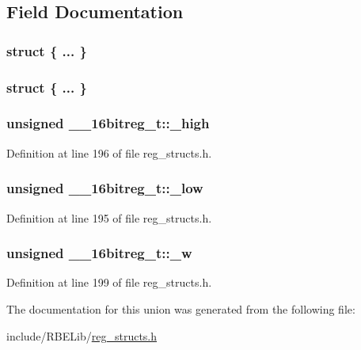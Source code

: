 \subsection{Field Documentation}
\hypertarget{union____16bitreg__t_ab909e9b2412865a9e97536d692f260b9}{\subsubsection[{"@43}]{\setlength{\rightskip}{0pt plus 5cm}struct \{ ... \} }}\label{union____16bitreg__t_ab909e9b2412865a9e97536d692f260b9}
\hypertarget{union____16bitreg__t_a9fd4cd99474251f90c63248760bd2a0a}{\subsubsection[{"@45}]{\setlength{\rightskip}{0pt plus 5cm}struct \{ ... \} }}\label{union____16bitreg__t_a9fd4cd99474251f90c63248760bd2a0a}
\hypertarget{union____16bitreg__t_a6a6132a8e0bb2790f3d7efcd7ee5b970}{
\subsubsection[{\+\_\+high}]{\setlength{\rightskip}{0pt plus 5cm}unsigned \+\_\+\+\_\+16bitreg\+\_\+t\+::\+\_\+high}}\label{union____16bitreg__t_a6a6132a8e0bb2790f3d7efcd7ee5b970}


Definition at line 196 of file reg\+\_\+structs.\+h.

\hypertarget{union____16bitreg__t_a9be891e55b5143ae68b469bb8a6078cb}{
\subsubsection[{\+\_\+low}]{\setlength{\rightskip}{0pt plus 5cm}unsigned \+\_\+\+\_\+16bitreg\+\_\+t\+::\+\_\+low}}\label{union____16bitreg__t_a9be891e55b5143ae68b469bb8a6078cb}


Definition at line 195 of file reg\+\_\+structs.\+h.

\hypertarget{union____16bitreg__t_a9dbb4f0c94a03ccdb3ea488d6de97e23}{
\subsubsection[{\+\_\+w}]{\setlength{\rightskip}{0pt plus 5cm}unsigned \+\_\+\+\_\+16bitreg\+\_\+t\+::\+\_\+w}}\label{union____16bitreg__t_a9dbb4f0c94a03ccdb3ea488d6de97e23}


Definition at line 199 of file reg\+\_\+structs.\+h.



The documentation for this union was generated from the following file\+:\begin{DoxyCompactItemize}
\item 
include/\+R\+B\+E\+Lib/\hyperlink{reg__structs_8h}{reg\+\_\+structs.\+h}\end{DoxyCompactItemize}
